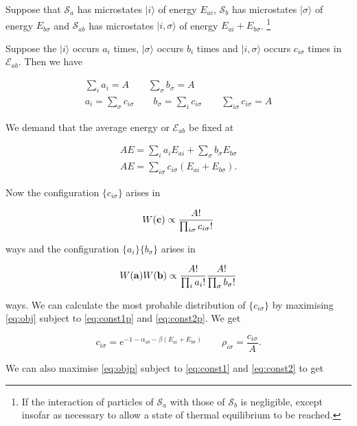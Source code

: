 \documentclass{notes}
\newcommand{\cS}{\mathcal{S}}
\newcommand{\cE}{\mathcal{E}}
\newcommand{\ket}[1]{|#1\rangle}
\begin{document}
Suppose that $\cS_a$ has microstates $\ket{i}$ of energy $E_{ai}$,
$\cS_b$ has microstates $\ket{\sigma}$ of energy $E_{b \sigma}$
and $\cS_{ab}$ has microstates $\ket{i,\sigma}$ of energy
$E_{ai} + E_{b\sigma}$.%
\footnote{If the interaction of particles of $\cS_a$ with those
of $\cS_b$ is negligible, except insofar as necessary to allow a
state of thermal equilibrium to be reached.}

Suppose the $\ket{i}$ occurs $a_i$ times, $\ket{\sigma}$ occurs
$b_i$ times and $\ket{i,\sigma}$ occurs $c_{i \sigma}$ times in
$\cE_{ab}$.  Then we have

\begin{gather}
\sum_i a_i = A  \qquad \sum_\sigma b_\sigma = A \label{eq:const1} \\
a_i = \sum_{\sigma} c_{i \sigma} \qquad b_\sigma = \sum_i c_{i \sigma} \qquad
\sum_{i \sigma} c_{i \sigma} = A \label{eq:const1p} 
\end{gather}

We demand that the average energy or $\cE_{ab}$ be fixed at

\begin{gather}
A E = \sum_i a_i E_{a i} + \sum_\sigma b_\sigma E_{b \sigma}
\label{eq:const2}\\
A E = \sum_{i \sigma} c_{i \sigma} \left(E_{a i} + E_{b \sigma}\right).
\label{eq:const2p}
\end{gather}

Now the configuration $\{ c_{i \sigma}\}$ arises in

\begin{equation}\label{eq:obj}
W(\mathbf{c}) \propto \frac{A!}{\prod_{i \sigma} c_{i \sigma}!}
\end{equation}

ways and the configuration $\{ a_i\} \{b_\sigma\}$ arises in

\begin{equation}\label{eq:objp}
W(\mathbf{a}) W(\mathbf{b}) \propto \frac{A!}{\prod_i a_i!} \frac{A!}{\prod_\sigma
b_\sigma!}
\end{equation}

ways.  We can calculate the most probable distribution of $\{ c_{i \sigma}\}$
by maximising \eqref{eq:obj} subject to \eqref{eq:const1p} and
\eqref{eq:const2p}.  We get

\[
c_{i \sigma} = e^{-1 - \alpha_{a b} - \beta \left(E_{a i}
+ E_{b \sigma}\right)} \qquad \rho_{i \sigma} = \frac{c_{i \sigma}}{A}.
\]

We can also maximise \eqref{eq:objp} subject to \eqref{eq:const1}
and \eqref{eq:const2} to get
\end{document}
